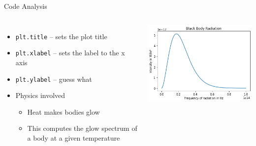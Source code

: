 
\begin{frame}[fragile]{Code Analysis}
%
\vspace{-10pt}
\begin{columns}[t]
\begin{itemize}
\item \texttt{plt.title} -- sets the plot title
\item \texttt{plt.xlabel} -- sets the label to the x axis
\item \texttt{plt.ylabel} -- guess what
\item Physics involved
	\begin{itemize}
	\item Heat makes bodies glow
	\item This computes the glow spectrum of a body at a given temperature
	\end{itemize}
\end{itemize}
%
\begin{tcolorbox}[title=Output: Headline and Axis Labels]
	\includegraphics[width=\linewidth]{./gfx/plt-labels}
\end{tcolorbox}
\end{columns}
%
\end{frame}


